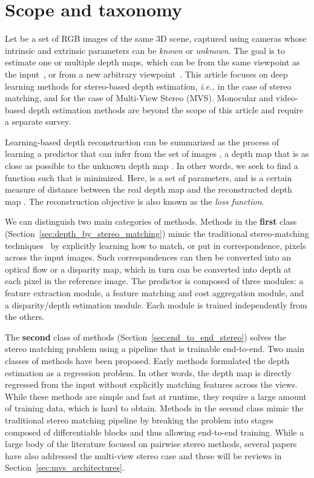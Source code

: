 \documentclass[10pt,journal,compsoc]{IEEEtran}
\newcommand{\ie}{\emph{i.e., }}
\begin{document}
\section{Scope and taxonomy}
\label{sec:problemstatement}

Let  be a set of  RGB images of the same 3D scene, captured using cameras whose intrinsic and extrinsic parameters can be   \emph{known} or \emph{unknown}.   The goal is to estimate one or multiple depth maps, which can be from the same viewpoint as the input~\cite{li2015depth,eigen2015predicting,garg2016unsupervised,liu2016learning},   or from a new arbitrary viewpoint~\cite{yang2015weakly,kulkarni2015deep,tatarchenko2016multi,zhou2016view,park2017transformation}.  This article focuses on deep learning methods for  stereo-based depth estimation, \ie  in the case of stereo matching, and  for the case of Multi-View Stereo (MVS). Monocular and video-based depth estimation methods are beyond the scope of this article and require a separate survey.








Learning-based depth reconstruction can be summarized as the process of learning a predictor  that can infer from the set of images ,  a depth map  that is as close as possible to the unknown depth map .  In other words, we seek to find a function  such that  is minimized. Here,  is a set of parameters, and   is a certain measure of distance between the real depth map  and the reconstructed depth map .  The reconstruction objective   is also known as the  \emph{loss function}.  

We can distinguish two main categories of methods. Methods in the \textbf{first} class (Section~\ref{sec:depth_by_stereo_matching}) mimic the traditional stereo-matching techniques~\cite{scharstein2002taxonomy} by explicitly learning how to match, or put in correspondence, pixels across the input images. Such correspondences can then be converted into an optical flow or a disparity map, which in turn can be converted into depth at each  pixel in the reference image.   The predictor  is composed of three modules: a feature extraction module, a feature matching and cost aggregation module, and a disparity/depth estimation module. Each module is trained independently from the others. 

The \textbf{second} class of methods (Section~\ref{sec:end_to_end_stereo}) solves the stereo matching problem using a pipeline that is trainable end-to-end.  Two main classes of methods have been proposed. Early methods formulated the depth estimation as a regression problem. In other words, the depth map is directly regressed from the input without explicitly matching features across the views. While these methods are simple and fast at runtime, they require a large amount of training data, which is hard to obtain. Methods in the second class mimic the traditional stereo matching pipeline by breaking the problem into stages composed of differentiable blocks and thus allowing end-to-end training. While a large body of the literature focused on pairwise stereo methods, several papers have also addressed the multi-view stereo case and these will be reviews in Section~\ref{sec:mvs_architectures}.
\end{document}
